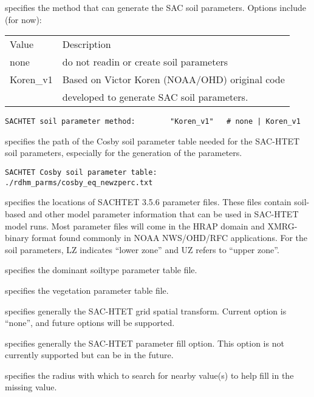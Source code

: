  
  specifies the method
  that can generate the SAC soil parameters.
 Options include (for now):

 \begin{tabular}{ll}
 Value     & Description                  \\
 none      &  do not readin or create soil parameters \\
 Koren\_v1 & Based on Victor Koren (NOAA/OHD) original code\\
           &  developed to generate SAC soil parameters.\\
 \end{tabular}
 
 \begin{Verbatim}[frame=single]
SACHTET soil parameter method:        "Koren_v1"   # none | Koren_v1
 \end{Verbatim}

 
  specifies the path 
  of the Cosby soil parameter table needed for the SAC-HTET 
  soil parameters, especially for the generation of the parameters.
 
 \begin{Verbatim}[frame=single]
SACHTET Cosby soil parameter table:  ./rdhm_parms/cosby_eq_newzperc.txt
 \end{Verbatim}

 
  specifies the locations of SACHTET 3.5.6 
 parameter files.  These files contain soil-based and other model
 parameter information that can be used in SAC-HTET model runs.
 Most parameter files will come in the HRAP domain and XMRG-binary format
 found commonly in NOAA NWS/OHD/RFC applications.
 For the soil parameters, LZ indicates ``lower zone'' and UZ refers to ``upper zone''.

  specifies the 
 dominant soiltype parameter table file.

  specifies the
 vegetation parameter table file. 

  specifies generally the SAC-HTET
  grid spatial transform.  Current option is ``none'', and future options
  will be supported.

  specifies generally the SAC-HTET
  parameter fill option.  This option is not currently supported but
 can be in the future.

  specifies the radius with which
 to search for nearby value(s) to help fill in the missing value.

